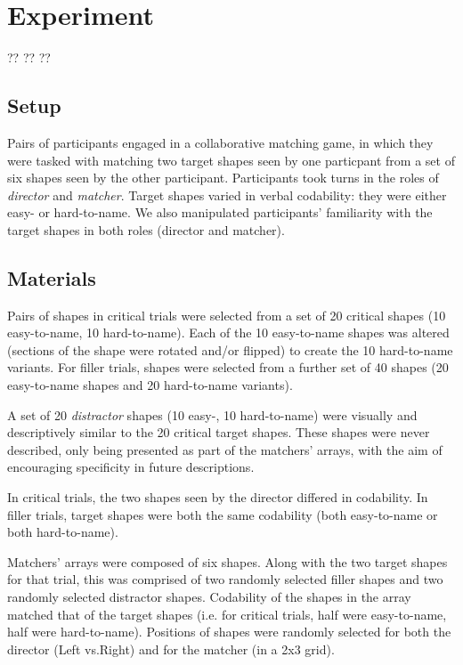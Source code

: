 \documentclass[a4paper,man,natbib]{apa6}
\newcommand*{\term}[1]{\emph{#1}} %
\begin{document}
\section{Experiment}

??
??
??



\subsection{Setup}
Pairs of participants engaged in a collaborative matching game, in which they were tasked with matching two target shapes seen by one particpant from a set of six shapes seen by the other participant. 
Participants took turns in the roles of \term{director} and \term{matcher}.
Target shapes varied in verbal codability: they were either easy- or hard-to-name.
We also manipulated participants' familiarity with the target shapes in both roles (director and matcher).


\subsection{Materials}
Pairs of shapes in critical trials were selected from a set of 20 critical shapes (10 easy-to-name, 10 hard-to-name).
Each of the 10 easy-to-name shapes was altered (sections of the shape were rotated and/or flipped) to create the 10 hard-to-name variants. %
For filler trials, shapes were selected from a further set of 40 shapes (20 easy-to-name shapes and 20 hard-to-name variants). 

A set of 20 \term{distractor} shapes (10 easy-, 10 hard-to-name) were visually and descriptively similar to the 20 critical target shapes. %
These shapes were never described, only being presented as part of the matchers' arrays, with the aim of encouraging specificity in future descriptions.

In critical trials, the two shapes seen by the director differed in codability.
In filler trials, target shapes were both the same codability (both easy-to-name or both hard-to-name).

Matchers' arrays were composed of six shapes.
Along with the two target shapes for that trial, this was comprised of two randomly selected filler shapes and two randomly selected distractor shapes. 
Codability of the shapes in the array matched that of the target shapes (i.e. for critical trials, half were easy-to-name, half were hard-to-name).
Positions of shapes were randomly selected for both the director (Left vs.\@ Right) and for the matcher (in a 2x3 grid).
\end{document}
